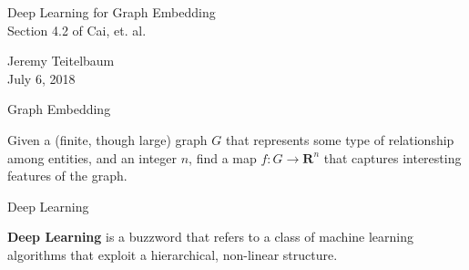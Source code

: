 \documentclass{beamer}
\begin{document}
\begin{frame}
  \begin{center}
    Deep Learning for Graph Embedding \\
    Section 4.2 of Cai, et. al. \\
  \end{center}

  \vskip 1.5in
  Jeremy Teitelbaum \\
  July 6, 2018
\end{frame}

\begin{frame}{Graph Embedding}
  \begin{problem} Given a (finite, though large) graph $G$ that represents some type of relationship among
    entities, and an integer $n$,  find a map $f:G\to \mathbf{R}^{n}$ that captures interesting features of the graph.
  \end{problem}

  
\end{frame}
\begin{frame}{Deep Learning}
  \begin{definition} \textbf{Deep Learning} is a buzzword that refers to a class of machine learning algorithms
    that exploit a hierarchical, non-linear structure.
  \end{definition}
\end{frame}
\end{document}
